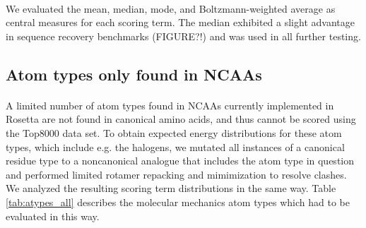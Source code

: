 \paragraph{}
We evaluated the mean, median, mode, and Boltzmann-weighted average as central measures for each scoring term.
The median exhibited a slight advantage in sequence recovery benchmarks (FIGURE?!) and was used in all further testing.

\subsection{Atom types only found in NCAAs}
\paragraph{}
A limited number of atom types found in NCAAs currently implemented in Rosetta are not found in canonical amino acids, and thus cannot be scored using the Top8000 data set.
To obtain expected energy distributions for these atom types, which include e.g. the halogens, we mutated all instances of a canonical residue type to a noncanonical analogue that includes the atom type in question and performed limited rotamer repacking and mimimization to resolve clashes.
We analyzed the resulting scoring term distributions in the same way.
Table \ref{tab:atypes_all} describes the molecular mechanics atom types which had to be evaluated in this way.


